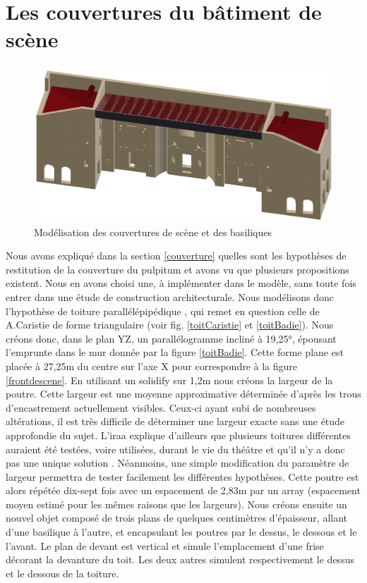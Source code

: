 \section{Les couvertures du bâtiment de scène}
\label{sect-couverture}

\begin{figure}[!h]
	\includegraphics[width=\linewidth]{images/modCouvertures}
	\caption{Modélisation des couvertures de scène et des basiliques} 
	\label{modCouvertures} 
\end{figure} 
Nous avons expliqué dans la section \ref{couverture} quelles sont les hypothèses de restitution de la couverture du \gls{pulpitum} et avons vu que plusieurs propositions existent. Nous en avons choisi une, à implémenter dans le modèle, sans toute fois entrer dans une étude de construction architecturale. Nous modélisons donc l'hypothèse de toiture parallélépipédique \cite[Chap. I, sect. 6]{orangeTxt}, qui remet en question celle de A.Caristie de forme triangulaire (voir fig. \ref{toitCaristie} et \ref{toitBadie}). Nous créons donc, dans le plan YZ, un parallélogramme incliné à 19,25°, épousant l'emprunte dans le mur donnée par la figure \ref{toitBadie}. Cette forme plane est placée à 27,25m du centre sur l'axe X pour correspondre à la figure \ref{frontdescene}. En utilisant un \gls{solidify} sur 1,2m nous créons la largeur de la poutre. Cette largeur est une moyenne approximative déterminée d'après les trous d'encastrement actuellement visibles. Ceux-ci ayant subi de nombreuses altérations, il est très difficile de déterminer une largeur exacte sans une étude approfondie du sujet. L'\gls{iraa} explique d'ailleurs que plusieurs toitures différentes auraient été testées, voire utilisées, durant le vie du théâtre et qu'il n'y a donc pas une unique solution \cite[p. 34]{orangeTxt}. Néanmoins, une simple modification du paramètre de largeur permettra de tester facilement les différentes hypothèses. Cette poutre est alors répétée dix-sept fois avec un espacement de 2,83m par un \gls{array} (espacement moyen estimé pour les mêmes raisons que les largeurs). Nous créons ensuite un nouvel objet composé de trois plans de quelques centimètres d'épaisseur, allant d'une basilique à l'autre, et encapsulant les poutres par le dessus, le dessous et le l'avant. Le plan de devant est vertical et simule l'emplacement d'une frise décorant la devanture du toit. Les deux autres simulent respectivement le dessus et le dessous de la toiture.

